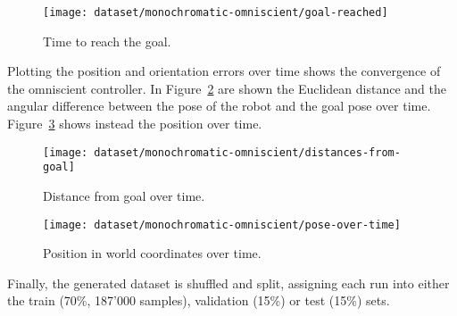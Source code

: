 \begin{figure}[htbp]
\centerline{\texttt{[image: dataset/monochromatic-omniscient/goal-reached]}}
	\caption{Time to reach the goal.}
	\label{fig:goal-reached-omniscient}
\end{figure}

Plotting the position and orientation errors over time shows the convergence of 
the omniscient controller. In Figure~\ref{fig:distance-from-goal-omniscient} 
are shown the Euclidean distance and the angular difference between the pose of 
the robot and the goal pose over time. Figure~\ref{fig:position-over-time} shows instead the position over time.

\begin{figure}[htbp]
\centerline{\texttt{[image: dataset/monochromatic-omniscient/distances-from-goal]}}
	\caption{Distance from goal over time.}
	\label{fig:distance-from-goal-omniscient}
\end{figure}

\begin{figure}[htbp]
\centerline{\texttt{[image: dataset/monochromatic-omniscient/pose-over-time]}}
	\caption{Position in world coordinates over time.}
	\label{fig:position-over-time}
\end{figure}

Finally, the generated dataset is shuffled and split, assigning each run 
into either the train (70\%, 187'000 samples), validation (15\%) or test (15\%) 
sets.
